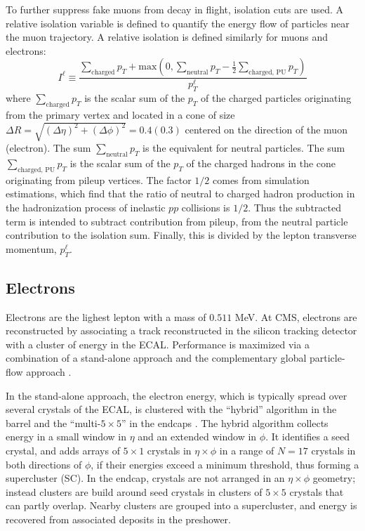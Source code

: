To further suppress fake muons from decay in flight, isolation cuts are used. A relative isolation variable is defined to quantify the energy flow of particles near the muon trajectory.
A relative isolation is defined similarly for muons and electrons:
\begin{equation}
    I^\ell \equiv \frac{\sum_{\text{charged}} p_{T} + \text{max}\left( 0, \sum_{\text{neutral}} p_{T} - \frac{1}{2}  \sum_{\text{charged, PU}} p_{T}  \right)}{p_{T}^\ell}
    \label{eqn:definition-relative-isolation}
\end{equation}
where $\sum_{\text{charged}} p_{T}$ is the scalar sum of the $p_{T}$ of the charged particles originating from the primary vertex and located in a cone of size $\Delta R = \sqrt{(\Delta \eta)^2 + (\Delta \phi)^2} = 0.4 (0.3)$ centered on the direction of the muon (electron). The sum $\sum_{\text{neutral}} p_{T}$ is the equivalent for neutral particles. The sum $\sum_{\text{charged, PU}} p_{T}$ is the scalar sum of the $p_{T}$ of the charged hadrons in the cone originating from pileup vertices. The factor $1/2$ comes from simulation estimations, which find that the ratio of neutral to charged hadron production in the hadronization process of inelastic $pp$ collisions is $1/2$. Thus the subtracted term is intended to subtract contribution from pileup, from the neutral particle contribution to the isolation sum. Finally, this is divided by the lepton transverse momentum, $p_{T}^\ell$. 


\subsection{Electrons}
Electrons are the lighest lepton with a mass of $0.511$ MeV. At CMS, electrons are reconstructed by associating a track reconstructed in the silicon tracking detector with a cluster of energy in the ECAL. Performance is maximized via a combination of a stand-alone approach and the complementary global particle-flow approach \citep{JINST-2015-10-P06005}. 

In the stand-alone approach, the electron energy, which is typically spread over several crystals of the ECAL, is clustered with the ``hybrid'' algorithm in the barrel and the ``multi-$5\times 5$'' in the endcaps \citep{JINST-2015-10-P06005}. The hybrid algorithm collects energy in a small window in $\eta$ and an extended window in $\phi$. It identifies a seed crystal, and adds arrays of $5 \times 1$ crystals in $\eta \times \phi$ in a range of $N = 17$ crystals in both directions of $\phi$, if their energies exceed a minimum threshold, thus forming a supercluster (SC).  In the endcap, crystals are not arranged in an $\eta \times \phi$ geometry; instead clusters are build around seed crystals in clusters of $5\times 5$ crystals that can partly overlap. Nearby clusters are grouped into a supercluster, and energy is recovered from associated deposits in the preshower. 

